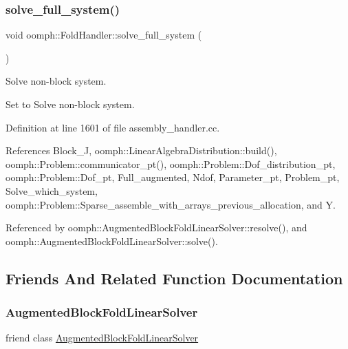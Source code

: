 \mbox{\label{classoomph_1_1FoldHandler_a506c9a7bb372c6d8799c6dabc9448f46}} 
\subsubsection{\texorpdfstring{solve\+\_\+full\+\_\+system()}{solve\_full\_system()}}
{\footnotesize\ttfamily void oomph\+::\+Fold\+Handler\+::solve\+\_\+full\+\_\+system (\begin{DoxyParamCaption}{ }\end{DoxyParamCaption})}



Solve non-\/block system. 

Set to Solve non-\/block system. 

Definition at line 1601 of file assembly\+\_\+handler.\+cc.



References Block\+\_\+J, oomph\+::\+Linear\+Algebra\+Distribution\+::build(), oomph\+::\+Problem\+::communicator\+\_\+pt(), oomph\+::\+Problem\+::\+Dof\+\_\+distribution\+\_\+pt, oomph\+::\+Problem\+::\+Dof\+\_\+pt, Full\+\_\+augmented, Ndof, Parameter\+\_\+pt, Problem\+\_\+pt, Solve\+\_\+which\+\_\+system, oomph\+::\+Problem\+::\+Sparse\+\_\+assemble\+\_\+with\+\_\+arrays\+\_\+previous\+\_\+allocation, and Y.



Referenced by oomph\+::\+Augmented\+Block\+Fold\+Linear\+Solver\+::resolve(), and oomph\+::\+Augmented\+Block\+Fold\+Linear\+Solver\+::solve().



\subsection{Friends And Related Function Documentation}
\mbox{\label{classoomph_1_1FoldHandler_a29d9c39e6a14d2a4cc4e0d7c716579fe}} 
\subsubsection{\texorpdfstring{Augmented\+Block\+Fold\+Linear\+Solver}{AugmentedBlockFoldLinearSolver}}
{\footnotesize\ttfamily friend class \hyperlink{classoomph_1_1AugmentedBlockFoldLinearSolver}{Augmented\+Block\+Fold\+Linear\+Solver}\hspace{0.3cm}{\ttfamily [friend]}}



